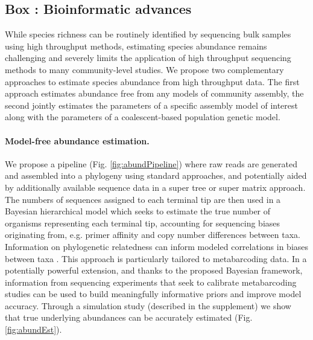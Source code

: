 \documentclass[12pt]{article}
\newcounter{Box}
\begin{document}
\label{box:dry}
\subsection*{Box \theBox: Bioinformatic advances}

While species richness can be routinely identified by sequencing bulk
samples using high throughput methods, estimating species abundance
remains challenging \citep{elbrecht2015} and severely limits the
application of high throughput sequencing methods to many
community-level studies. We propose two complementary approaches to
estimate species abundance from high throughput data.  The first
approach estimates abundance free from any models of community
assembly, the second jointly estimates the parameters of a specific
assembly model of interest along with the parameters of a
coalescent-based population genetic model.

\paragraph{Model-free abundance estimation.} We propose a pipeline
(Fig. \ref{fig:abundPipeline}) where raw reads are generated and
assembled into a phylogeny using standard approaches, and potentially
aided by additionally available sequence data in a super tree or super
matrix approach. The numbers of sequences assigned to each terminal
tip are then used in a Bayesian hierarchical model which seeks to
estimate the true number of organisms representing each terminal tip,
accounting for sequencing biases originating from, e.g. primer
affinity and copy number differences between taxa.  Information on
phylogenetic relatedness can inform modeled correlations in biases
between taxa \citep[e.g. copy number is known to be phylogenetically
conserved at least in microbes]{angly2014}. This approach is
particularly tailored to metabarcoding data. In a potentially powerful
extension, and thanks to the proposed Bayesian framework, information
from sequencing experiments that seek to calibrate metabarcoding
studies \citep[e.g.,][]{krehenwinkel2016, Saitoh2016} can be used to
build meaningfully informative priors and improve model
accuracy. Through a simulation study (described in the supplement) we
show that true underlying abundances can be accurately estimated
(Fig. \ref{fig:abundEst}).
\end{document}
